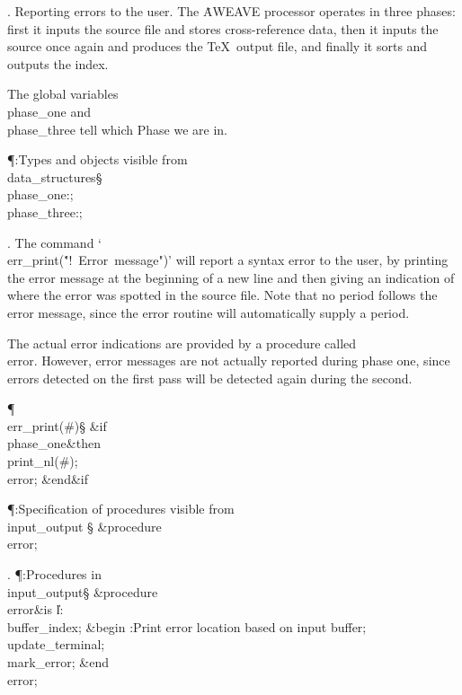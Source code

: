 .  Reporting errors to the user.
The \.{AWEAVE} processor operates in three phases: first it inputs the source
file and stores cross-reference data, then it inputs the source once again and
produces the \TeX\ output file, and finally it sorts and outputs the index.

The global variables \\{phase\_one} and \\{phase\_three} tell which Phase we
are in.

\Y\P\?\4:Types and objects visible from \\{data\_structures}\X\mathrel{+}\S%
\?\6
\\{phase\_one}\?:\?;\6
\\{phase\_three}\?:\?;\par
\fi

. The command `\\{err\_print}\?(\?\.{"!\ Error\ message"}\?)\?' will report
a syntax error to
the user, by printing the error message at the beginning of a new line and
then giving an indication of where the error was spotted in the source file.
Note that no period follows the error message, since the error routine
will automatically supply a period.

The actual error indications are provided by a procedure called \\{error}.
However, error messages are not actually reported during phase one,
since errors detected on the first pass will be detected again
during the second.

\Y\P\4\D\\{err\_print}\?\1(\?\#\?\2)\S\?\6
\&{if}\1\1\?\8\R\?\\{phase\_one}\2\8\&{then}\6
\\{print\_nl}\?\1(\?\#\?\2)\?;\5
\\{error};\2\6
\&{end}\8\2\&{if}\1\par
\Y\P\?\4:Specification of procedures visible from \\{input\_output}\X%
\mathrel{+}\S\?\6
\&{procedure}\8\1\\{error}\2;\par
\fi

. \P\?:Procedures in \\{input\_output}\X\mathrel{+}\S\?\6
\&{procedure}\8\1\\{error}\2\8\&{is}\8\1\6
\|l\?:\?\\{buffer\_index};\6
\4\&{begin}\6
:Print error location based on input buffer\X;\6
\\{update\_terminal};\5
\\{mark\_error};\2\6
\&{end}\8\\{error};\par
\fi

